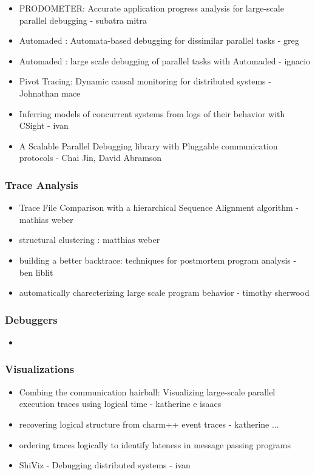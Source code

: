 \begin{itemize}
\item PRODOMETER: Accurate application progress analysis for large-scale parallel debugging - subatra mitra
\item Automaded : Automata-based debugging for dissimilar parallel tasks - greg
\item Automaded : large scale debugging of parallel tasks with Automaded - ignacio
\item Pivot Tracing: Dynamic causal monitoring for distributed systems - Johnathan mace
\item Inferring models of concurrent systems from logs of their behavior with CSight - ivan
\item A Scalable Parallel Debugging library with Pluggable communication protocols - Chai Jin, David Abramson
\end{itemize}




\subsubsection{Trace Analysis}


\begin{itemize}
\item Trace File Comparison with a hierarchical Sequence Alignment algorithm - mathias weber
\item structural clustering : matthias weber
\item building a better backtrace: techniques for postmortem program analysis - ben liblit
\item automatically charecterizing large scale program behavior - timothy sherwood
\end{itemize}

\subsubsection{Debuggers}


\begin{itemize}
\item 
\end{itemize}


\subsubsection{Visualizations}


\begin{itemize}
\item Combing the communication hairball: Visualizing large-scale parallel execution traces using logical time - katherine e isaacs
\item recovering logical structure from charm++ event traces - katherine ...
\item ordering traces logically to identify lateness in message passing programs
\item ShiViz - Debugging distributed systems - ivan 
\end{itemize}



